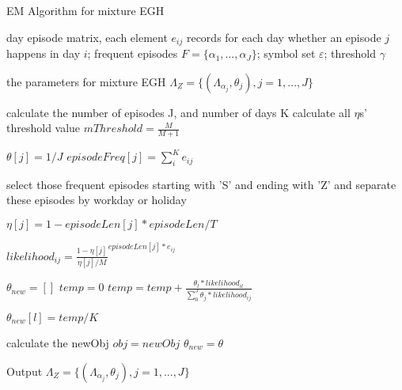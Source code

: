 \renewcommand{\algorithmicrequire}{\textbf{Input:}}
\renewcommand{\algorithmicensure}{\textbf{Output:}}

\begin{algorithm}
\caption{EM Algorithm for mixture EGH}
\label{alg3}
\begin{algorithmic} [1]
\REQUIRE day episode matrix, 
each element $e_{ij}$ records for each day whether an episode $j$ happens in day $i$;
frequent episodes $F=\{\alpha_1, ..., \alpha_J\}$;
symbol set $\varepsilon$;
threshold $\gamma$

\ENSURE the parameters for mixture EGH $\Lambda_Z=\{  (\Lambda_{\alpha_j}, \theta_j ) , j=1,...,J \}$


\STATE calculate the number of episodes J, and number of days K
\STATE calculate all $\eta$s' threshold value $mThreshold= \frac{M}{M+1}$

\STATE $\theta[j]= 1/J$
\STATE $episodeFreq[j] = \sum_i^K e_{ij}$
\ENDFOR

\STATE select those frequent episodes starting with 'S' and ending with 'Z' and separate these 
episodes by workday or holiday

\STATE $\eta[j]= 1-episodeLen[j]*episodeLen/T$
\ENDFOR


\STATE $likelihood_{ij} = \frac{1-\eta[j]}{\eta[j]/M} ^ {episodeLen[j]*e_{ij}}$
\ENDFOR
\ENDFOR

\STATE $\theta_{new}=[]$
\STATE $temp=0$
\STATE $temp = temp+ \frac{\theta_l*likelihood_{il}}{ \sum_0^J { \theta_j*likelihood_{ij}}}$

\ENDFOR
\STATE $\theta_{new}[l] = temp/K $
\ENDFOR

\STATE calculate the newObj
\STATE $obj=newObj$
\STATE $\theta_{new} = \theta$
\ENDIF

\ENDWHILE

\STATE Output $\Lambda_Z=\{  (\Lambda_{\alpha_j}, \theta_j ) , j=1,...,J \}$

\end{algorithmic}
\end{algorithm}